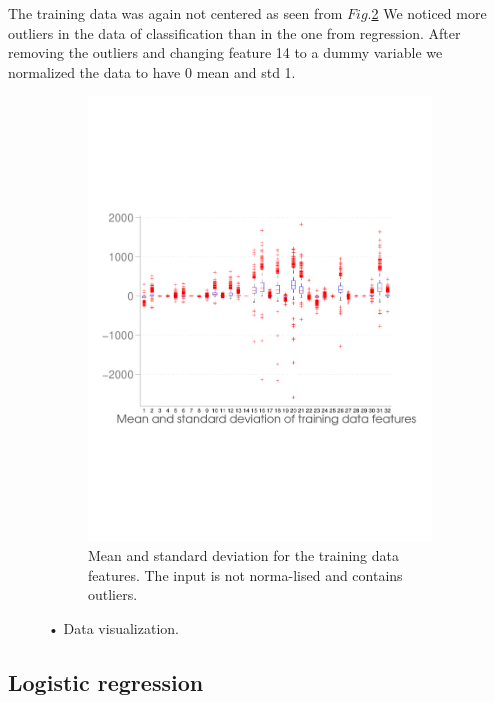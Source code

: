 \documentclass{article} %
\begin{document}
The training data was again not centered as seen from $Fig.$\ref{fig:dist_classification}
We noticed more outliers in the data of classification than in the one from regression. After removing the outliers and changing feature 14 to a dummy variable we normalized the data to have 0 mean and std 1.
{%
\begin{figure}[h]
  \begin{subfigure}[b]{0.7\textwidth}
   \includegraphics[width=\textwidth]{figures/ClassificationDistr.pdf}
    \caption{Mean and standard deviation for the training data features. The input is not norma-\newline lised and contains outliers.}
    \label{fig:dist_classification}
  \end{subfigure}
  \caption{• Data visualization. }
\end{figure}

\subsection{Logistic regression}
}
\end{document}
